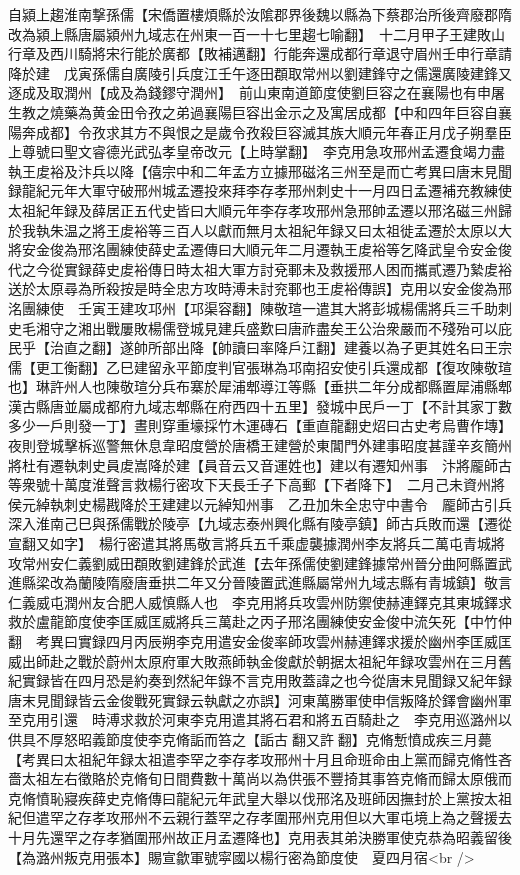 自潁上趨淮南撃孫儒【宋僑置樓煩縣於汝隂郡界後魏以縣為下蔡郡治所後齊廢郡隋改為潁上縣唐屬潁州九域志在州東一百一十七里趨七喻翻】　十二月甲子王建敗山行章及西川騎將宋行能於廣都【敗補邁翻】行能奔還成都行章退守眉州壬申行章請降於建　戊寅孫儒自廣陵引兵度江壬午逐田頵取常州以劉建鋒守之儒還廣陵建鋒又逐成及取潤州【成及為錢鏐守潤州】　前山東南道節度使劉巨容之在襄陽也有申屠生教之燒藥為黄金田令孜之弟過襄陽巨容出金示之及寓居成都【中和四年巨容自襄陽奔成都】令孜求其方不與恨之是歲令孜殺巨容滅其族大順元年春正月戊子朔羣臣上尊號曰聖文睿德光武弘孝皇帝改元【上時掌翻】　李克用急攻邢州孟遷食竭力盡執王䖍裕及汴兵以降【僖宗中和二年孟方立據邢磁洺三州至是而亡考異曰唐末見聞録龍紀元年大軍守破邢州城孟遷投來拜李存孝邢州刺史十一月四日孟遷補充教練使太祖紀年録及薛居正五代史皆曰大順元年李存孝攻邢州急邢帥孟遷以邢洺磁三州歸於我執朱温之將王䖍裕等三百人以獻而無月太祖紀年録又曰太祖徙孟遷於太原以大將安金俊為邢洺團練使薛史孟遷傳曰大順元年二月遷執王䖍裕等乞降武皇令安金俊代之今從實録薛史䖍裕傳日時太祖大軍方討兗鄆未及救援邢人困而攜貳遷乃縶䖍裕送於太原尋為所殺按是時全忠方攻時溥未討兖鄆也王䖍裕傳誤】克用以安金俊為邢洺團練使　壬寅王建攻邛州【邛渠容翻】陳敬瑄一遣其大將彭城楊儒將兵三千助刺史毛湘守之湘出戰屢敗楊儒登城見建兵盛歎曰唐祚盡矣王公治衆嚴而不殘殆可以庇民乎【治直之翻】遂帥所部出降【帥讀曰率降戶江翻】建養以為子更其姓名曰王宗儒【更工衡翻】乙巳建留永平節度判官張琳為邛南招安使引兵還成都【復攻陳敬瑄也】琳許州人也陳敬瑄分兵布寨於犀浦郫導江等縣【垂拱二年分成都縣置犀浦縣郫漢古縣唐並屬成都府九域志郫縣在府西四十五里】發城中民戶一丁【不計其家丁數多少一戶則發一丁】晝則穿重壕採竹木運磚石【重直龍翻史炤曰古史考烏曹作塼】夜則登城擊柝巡警無休息韋昭度營於唐橋王建營於東閶門外建事昭度甚謹辛亥簡州將杜有遷執刺史員䖍嵩降於建【員音云又音運姓也】建以有遷知州事　汴將龎師古等衆號十萬度淮聲言救楊行密攻下天長壬子下高郵【下者降下】　二月己未資州將侯元綽執刺史楊戡降於王建建以元綽知州事　乙丑加朱全忠守中書令　龎師古引兵深入淮南己巳與孫儒戰於陵亭【九域志泰州興化縣有陵亭鎮】師古兵敗而還【遷從宣翻又如字】　楊行密遣其將馬敬言將兵五千乘虚襲據潤州李友將兵二萬屯青城將攻常州安仁義劉威田頵敗劉建鋒於武進【去年孫儒使劉建鋒據常州晉分曲阿縣置武進縣梁改為蘭陵隋廢唐垂拱二年又分晉陵置武進縣屬常州九域志縣有青城鎮】敬言仁義威屯潤州友合肥人威慎縣人也　李克用將兵攻雲州防禦使赫連鐸克其東城鐸求救於盧龍節度使李匡威匡威將兵三萬赴之丙子邢洺團練使安金俊中流矢死【中竹仲翻　考異曰實録四月丙辰朔李克用遣安金俊率師攻雲州赫連鐸求援於幽州李匡威匡威出師赴之戰於蔚州太原府軍大敗燕師執金俊獻於朝据太祖紀年録攻雲州在三月舊紀實録皆在四月恐是約奏到然紀年錄不言克用敗蓋諱之也今從唐末見聞録又紀年録唐末見聞録皆云金俊戰死實録云執獻之亦誤】河東萬勝軍使申信叛降於鐸會幽州軍至克用引還　時溥求救於河東李克用遣其將石君和將五百騎赴之　李克用巡潞州以供具不厚怒昭義節度使李克脩詬而笞之【詬古翻又許翻】克脩慙憤成疾三月薨　【考異曰太祖紀年録太祖遣李罕之李存孝攻邢州十月且命班命由上黨而歸克脩性吝嗇太祖左右徵賂於克脩旬日間費數十萬尚以為供張不豐掎其事笞克脩而歸太原俄而克脩憤恥寢疾薛史克脩傳曰龍紀元年武皇大舉以伐邢洺及班師因撫封於上黨按太祖紀但遣罕之存孝攻邢州不云親行蓋罕之存孝圍邢州克用但以大軍屯境上為之聲援去十月先還罕之存孝猶圍邢州故正月孟遷降也】克用表其弟決勝軍使克恭為昭義留後【為潞州叛克用張本】賜宣歙軍號寜國以楊行密為節度使　夏四月宿<br />
